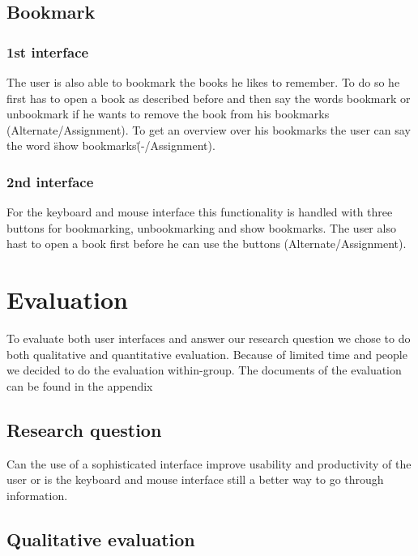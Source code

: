 \documentclass[a4paper, 10pt]{article}
\begin{document}
	\subsection{Bookmark}
	
	\subsubsection{1st interface}
	
	\par{The user is also able to bookmark the books he likes to remember. To do so he first has to open a book as described before and then say the words bookmark or unbookmark if he wants to remove the book from his bookmarks (Alternate/Assignment). To get an overview over his bookmarks the user can say the word \"show bookmarks\" (-/Assignment).}
	
	\subsubsection{2nd interface}
	
	\par{For the keyboard and mouse interface this functionality is handled with three buttons for bookmarking, unbookmarking and show bookmarks. The user also hast to open a book first before he can use the buttons (Alternate/Assignment).}
	
	
	\section{Evaluation}
	
	\par{To evaluate both user interfaces and answer our research question we chose to do both qualitative and quantitative evaluation. Because of limited time and people we decided to do the evaluation within-group. The documents of the evaluation can be found in the appendix}
	
	\subsection{Research question}
	
	\par{Can the use of a sophisticated interface improve usability and productivity of the user or is the keyboard and mouse interface still a better way to go through information.}
	
	\subsection{Qualitative evaluation}
	
\end{document}

